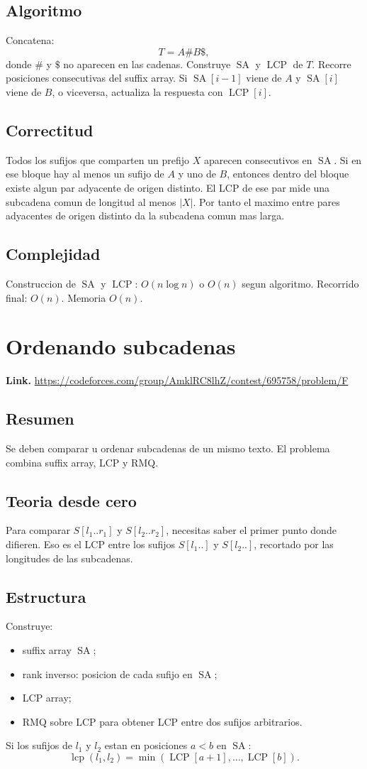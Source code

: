 \documentclass[10pt]{article}
\newcommand{\bigO}{O}
\newcommand{\SA}{\operatorname{SA}}
\newcommand{\LCP}{\operatorname{LCP}}
\begin{document}
\subsection*{Algoritmo}
Concatena:
\[
T = A \# B \$,
\]
donde $\#$ y $\$$ no aparecen en las cadenas. Construye $\SA$ y $\LCP$ de $T$.
Recorre posiciones consecutivas del suffix array. Si $\SA[i-1]$ viene de $A$ y
$\SA[i]$ viene de $B$, o viceversa, actualiza la respuesta con $\LCP[i]$.

\subsection*{Correctitud}
Todos los sufijos que comparten un prefijo $X$ aparecen consecutivos en $\SA$.
Si en ese bloque hay al menos un sufijo de $A$ y uno de $B$, entonces dentro del
bloque existe algun par adyacente de origen distinto. El LCP de ese par mide una
subcadena comun de longitud al menos $|X|$. Por tanto el maximo entre pares
adyacentes de origen distinto da la subcadena comun mas larga.

\subsection*{Complejidad}
Construccion de $\SA$ y $\LCP$: $\bigO(n\log n)$ o $\bigO(n)$ segun algoritmo.
Recorrido final: $\bigO(n)$. Memoria $\bigO(n)$.

\clearpage
\section{Ordenando subcadenas}
\textbf{Link.} \url{https://codeforces.com/group/AmklRC8lhZ/contest/695758/problem/F}

\subsection*{Resumen}
Se deben comparar u ordenar subcadenas de un mismo texto. El problema combina
suffix array, LCP y RMQ.

\subsection*{Teoria desde cero}
Para comparar $S[l_1..r_1]$ y $S[l_2..r_2]$, necesitas saber el primer punto
donde difieren. Eso es el LCP entre los sufijos $S[l_1..]$ y $S[l_2..]$,
recortado por las longitudes de las subcadenas.

\subsection*{Estructura}
Construye:
\begin{itemize}[leftmargin=*]
\item suffix array $\SA$;
\item rank inverso: posicion de cada sufijo en $\SA$;
\item LCP array;
\item RMQ sobre LCP para obtener LCP entre dos sufijos arbitrarios.
\end{itemize}
Si los sufijos de $l_1$ y $l_2$ estan en posiciones $a<b$ en $\SA$:
\[
\operatorname{lcp}(l_1,l_2)=\min(\LCP[a+1],\ldots,\LCP[b]).
\]
\end{document}

